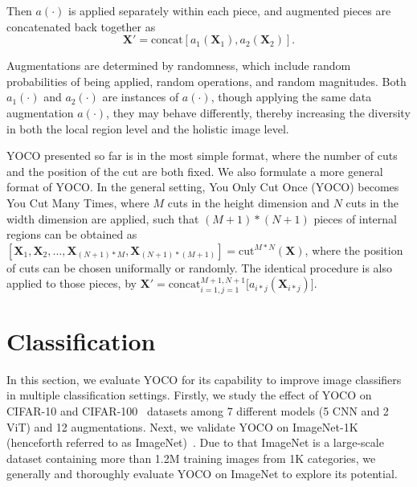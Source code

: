 \documentclass{article}
\def\Vec#1{{\boldsymbol{#1}}}
\begin{document}
Then $a(\cdot)$ is applied separately within each piece, and augmented pieces are concatenated back together as $$\Vec{X}' = \mathrm{concat}[a_1(\Vec{X}_1), a_2(\Vec{X}_2)].$$

Augmentations are determined by randomness, which include random probabilities of being applied, random operations, and random magnitudes. Both $a_1(\cdot)$ and $a_2(\cdot)$ are instances of $a(\cdot)$, though applying the same data augmentation $a(\cdot)$, they may behave differently, thereby increasing the diversity in both the local region level and the holistic image level.

YOCO presented so far is in the most simple format, where the number of cuts and the position of the cut are both fixed. 
We also formulate a more general format of YOCO. In the general setting, You Only Cut Once (YOCO) becomes You Cut Many Times, where
$M$ cuts in the height dimension and $N$ cuts in the width dimension are applied, such that $(M+1) * (N+1)$ pieces of internal regions can be obtained as $[\Vec{X}_1, \Vec{X}_2, ..., \Vec{X}_{(N+1)*M}, \Vec{X}_{(N+1)*(M+1)}] = \mathrm{cut}^{M*N}(\Vec{X})$, where the position of cuts can be chosen uniformally or randomly. 
The identical procedure is also applied to those pieces, by $\Vec{X}' = \mathrm{concat}_{i =1, j = 1}^{M+1,N+1}\big[ a_{i*j} (\Vec{X}_{i*j}) \big].$


 



\section{Classification}
In this section, we evaluate YOCO for its capability to improve image classifiers in multiple classification settings. Firstly, we study the effect of YOCO on CIFAR-10 and CIFAR-100~\cite{krizhevsky2009learning} datasets among 7 different models (5 CNN and 2 ViT) and 12 augmentations. Next, we validate YOCO on ImageNet-1K (henceforth referred to as ImageNet)~\cite{imagenet}. Due to that ImageNet is a large-scale dataset containing more than 1.2M training images from 1K categories, we generally and thoroughly evaluate YOCO on ImageNet to explore its potential.
\end{document}
